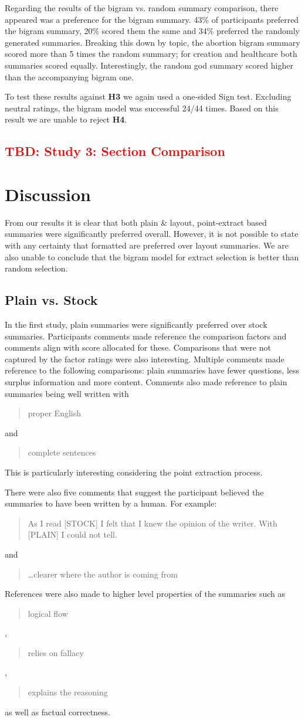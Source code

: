       Regarding the results of the bigram vs. random summary comparison, there appeared was a preference for the bigram summary. 43\% of participants preferred the bigram summary, 20\% scored them the same and 34\% preferred the randomly generated summaries. Breaking this down by topic, the abortion bigram summary scored more than 5 times the random summary; for creation and healthcare both summaries scored equally. Interestingly, the random god summary scored higher than the accompanying bigram one.

      To test these results against \textbf{H3} we again used a one-sided Sign test. Excluding neutral ratings, the bigram model was successful 24/44 times. Based on this result we are unable to reject \textbf{H4}.

    \tocless\subsection{\textcolor{red}{TBD: Study 3: Section Comparison}}

  \section{Discussion}
    From our results it is clear that both plain \& layout, point-extract based summaries were significantly preferred overall. However, it is not possible to state with any certainty that formatted are preferred over layout summaries. We are also unable to conclude that the bigram model for extract selection is better than random selection.

    \tocless\subsection{Plain vs. Stock}
      In the first study, plain summaries were significantly preferred over stock summaries. Participants comments made reference the comparison factors and comments align with score allocated for these. Comparisons that were not captured by the factor ratings were also interesting. Multiple comments made reference to the following comparisons: plain summaries have fewer questions, less surplus information and more content. Comments also made reference to plain summaries being well written with \blockquote{proper English} and \blockquote{complete sentences}. This is particularly interesting considering the point extraction process.

      There were also five comments that suggest the participant believed the summaries to have been written by a human. For example: \blockquote{As I read [STOCK] I felt that I knew the opinion of the writer. With [PLAIN] I could not tell.} and \blockquote{\dots clearer where the author is coming from}. References were also made to higher level properties of the summaries such as \blockquote{logical flow}, \blockquote{relies on fallacy}, \blockquote{explains the reasoning} as well as factual correctness.


